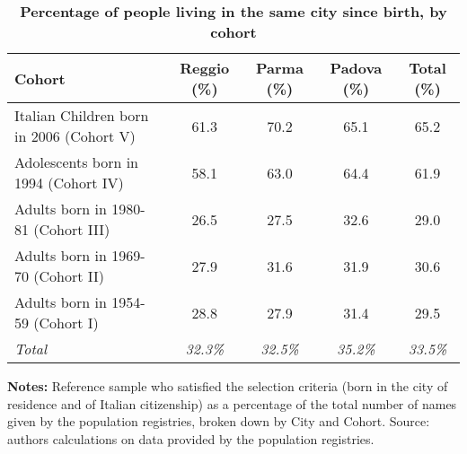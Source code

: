 \documentclass{article}
\begin{document}
\begin{table}[ht!]
\caption{\textbf{Percentage of people living in the same city since birth, by cohort}}
\label{tab:SameCity}
\vspace{-5mm}
\begin{center}
\begin{tabular}{ l c c c c }
\hline\hline
\textbf{Cohort} & \textbf{Reggio (\%)} & \textbf{Parma (\%)} & \textbf{Padova (\%)} & \textbf{Total (\%)}\\
\hline
Italian Children born in 2006 (Cohort V)   & 61.3  & 70.2  & 65.1  & 65.2 \\[0.2em]
Adolescents born in 1994 (Cohort IV)       & 58.1  & 63.0  & 64.4  & 61.9 \\[0.2em]
Adults born in 1980-81 (Cohort III)        & 26.5  & 27.5  & 32.6  & 29.0 \\[0.2em]
Adults born in 1969-70 (Cohort II)         & 27.9  & 31.6  & 31.9  & 30.6 \\[0.2em]
Adults born in 1954-59 (Cohort I)          & 28.8  & 27.9  & 31.4  & 29.5 \\[0.2em]
\hline
\textit{Total}         & \textit{32.3\%}  & \textit{32.5\%}  & \textit{35.2\%} & \textit{33.5\%} \\
\hline
\end{tabular}
\end{center}
\footnotesize{{\bfseries Notes:} Reference sample who satisfied the selection criteria (born in the city of residence and of Italian citizenship) as a percentage of the total number of names given by the population registries, broken down by City and Cohort. Source: authors calculations on data provided by the population registries.}
\end{table}
\end{document}

